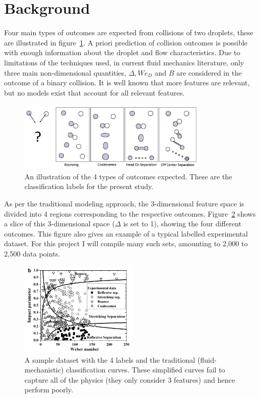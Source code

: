 \documentclass{article}
\begin{document}
\section{Background}
Four main types of outcomes are expected from collisions of two droplets, these are illustrated in figure~\ref{fig:outcomes}. A priori prediction of collision outcomes is possible with enough information about the droplet and flow characteristics. Due to limitations of the techniques used, in current fluid mechanics literature, only three main non-dimensional quantities, $\Delta, We_D$ and $B$ are considered in the outcome of a binary collision. It is well known that more features are relevant, but no models exist that account for all relevant features.

\begin{figure}
	\centering
	\includegraphics[width=0.8\textwidth]{../figures/outcome-illustration.png}
	\caption{An illustration of the 4 types of outcomes expected. These are the classification labels for the present study.}
	\label{fig:outcomes}
\end{figure}

As per the traditional modeling approach, the 3-dimensional feature space is divided into 4 regions corresponding to the respective outcomes. Figure~\ref{fig:munnannur} shows a slice of this 3-dimensional space ($\Delta$ is set to 1), showing the four different outcomes. This figure also gives an example of a typical labelled experimental dataset. For this project I will compile many such sets, amounting to 2,000 to 2,500 data points.

\begin{figure}[h]
	\centering
	\includegraphics[width=0.5\textwidth]{../figures/munnannur.png}
	\caption{A sample dataset with the 4 labels and the traditional (fluid-mechanistic) classification curves. These simplified curves fail to capture all of the physics (they only consider 3 features) and hence perform poorly.}
	\label{fig:munnannur}
\end{figure}
\end{document}
